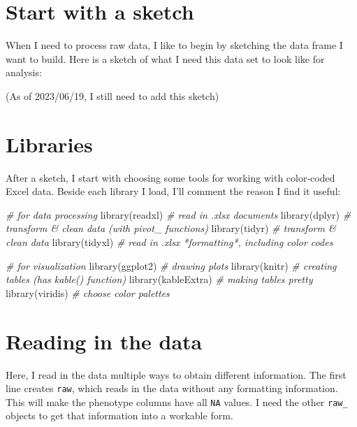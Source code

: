 \documentclass[
]{book}
\newenvironment{Shaded}{\begin{snugshade}}{\end{snugshade}}
\newcommand{\CommentTok}[1]{\textcolor[rgb]{0.56,0.35,0.01}{\textit{#1}}}
\newcommand{\FunctionTok}[1]{\textcolor[rgb]{0.00,0.00,0.00}{#1}}
\newcommand{\NormalTok}[1]{#1}
\begin{document}
\hypertarget{start-with-a-sketch}{%
\section{Start with a sketch}\label{start-with-a-sketch}}

When I need to process raw data, I like to begin by sketching the data frame I want to build. Here is a sketch of what I need this data set to look like for analysis:

(As of 2023/06/19, I still need to add this sketch)

\hypertarget{libraries}{%
\section{Libraries}\label{libraries}}

After a sketch, I start with choosing some tools for working with color-coded Excel data. Beside each library I load, I'll comment the reason I find it useful:

\begin{Shaded}
\begin{Highlighting}[]
\CommentTok{\# for data processing }
\FunctionTok{library}\NormalTok{(readxl) }\CommentTok{\# read in .xlsx documents }
\FunctionTok{library}\NormalTok{(dplyr) }\CommentTok{\# transform \& clean data (with \textquotesingle{}pivot\_\textquotesingle{} functions)}
\FunctionTok{library}\NormalTok{(tidyr) }\CommentTok{\# transform \& clean data }
\FunctionTok{library}\NormalTok{(tidyxl) }\CommentTok{\# read in .xlsx *formatting*, including color codes}

\CommentTok{\# for visualization }
\FunctionTok{library}\NormalTok{(ggplot2) }\CommentTok{\# drawing plots }
\FunctionTok{library}\NormalTok{(knitr) }\CommentTok{\# creating tables (has \textquotesingle{}kable()\textquotesingle{} function)}
\FunctionTok{library}\NormalTok{(kableExtra) }\CommentTok{\# making tables pretty }
\FunctionTok{library}\NormalTok{(viridis) }\CommentTok{\# choose color palettes}
\end{Highlighting}
\end{Shaded}

\hypertarget{reading-in-the-data}{%
\section{Reading in the data}\label{reading-in-the-data}}

Here, I read in the data multiple ways to obtain different information. The first line creates \texttt{raw}, which reads in the data without any formatting information. This will make the phenotype columns have all \texttt{NA} values. I need the other \texttt{raw\_} objects to get that information into a workable form.
\end{document}
